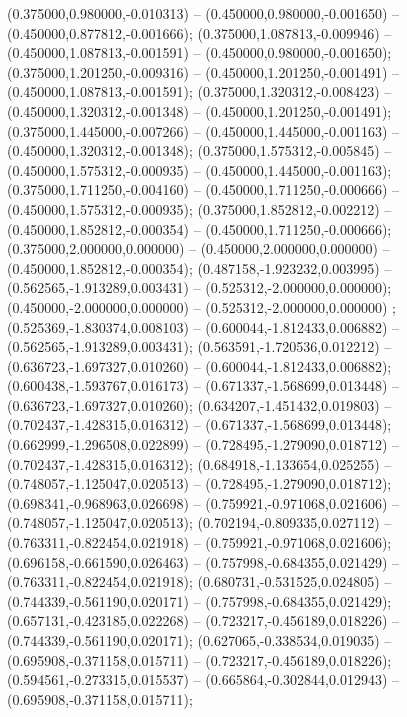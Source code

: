  (0.375000,0.980000,-0.010313) -- (0.450000,0.980000,-0.001650) -- (0.450000,0.877812,-0.001666);
 (0.375000,1.087813,-0.009946) -- (0.450000,1.087813,-0.001591) -- (0.450000,0.980000,-0.001650);
 (0.375000,1.201250,-0.009316) -- (0.450000,1.201250,-0.001491) -- (0.450000,1.087813,-0.001591);
 (0.375000,1.320312,-0.008423) -- (0.450000,1.320312,-0.001348) -- (0.450000,1.201250,-0.001491);
 (0.375000,1.445000,-0.007266) -- (0.450000,1.445000,-0.001163) -- (0.450000,1.320312,-0.001348);
 (0.375000,1.575312,-0.005845) -- (0.450000,1.575312,-0.000935) -- (0.450000,1.445000,-0.001163);
 (0.375000,1.711250,-0.004160) -- (0.450000,1.711250,-0.000666) -- (0.450000,1.575312,-0.000935);
 (0.375000,1.852812,-0.002212) -- (0.450000,1.852812,-0.000354) -- (0.450000,1.711250,-0.000666);
 (0.375000,2.000000,0.000000) -- (0.450000,2.000000,0.000000) -- (0.450000,1.852812,-0.000354);
 (0.487158,-1.923232,0.003995) -- (0.562565,-1.913289,0.003431) -- (0.525312,-2.000000,0.000000);
 (0.450000,-2.000000,0.000000) -- (0.525312,-2.000000,0.000000) ;
 (0.525369,-1.830374,0.008103) -- (0.600044,-1.812433,0.006882) -- (0.562565,-1.913289,0.003431);
 (0.563591,-1.720536,0.012212) -- (0.636723,-1.697327,0.010260) -- (0.600044,-1.812433,0.006882);
 (0.600438,-1.593767,0.016173) -- (0.671337,-1.568699,0.013448) -- (0.636723,-1.697327,0.010260);
 (0.634207,-1.451432,0.019803) -- (0.702437,-1.428315,0.016312) -- (0.671337,-1.568699,0.013448);
 (0.662999,-1.296508,0.022899) -- (0.728495,-1.279090,0.018712) -- (0.702437,-1.428315,0.016312);
 (0.684918,-1.133654,0.025255) -- (0.748057,-1.125047,0.020513) -- (0.728495,-1.279090,0.018712);
 (0.698341,-0.968963,0.026698) -- (0.759921,-0.971068,0.021606) -- (0.748057,-1.125047,0.020513);
 (0.702194,-0.809335,0.027112) -- (0.763311,-0.822454,0.021918) -- (0.759921,-0.971068,0.021606);
 (0.696158,-0.661590,0.026463) -- (0.757998,-0.684355,0.021429) -- (0.763311,-0.822454,0.021918);
 (0.680731,-0.531525,0.024805) -- (0.744339,-0.561190,0.020171) -- (0.757998,-0.684355,0.021429);
 (0.657131,-0.423185,0.022268) -- (0.723217,-0.456189,0.018226) -- (0.744339,-0.561190,0.020171);
 (0.627065,-0.338534,0.019035) -- (0.695908,-0.371158,0.015711) -- (0.723217,-0.456189,0.018226);
 (0.594561,-0.273315,0.015537) -- (0.665864,-0.302844,0.012943) -- (0.695908,-0.371158,0.015711);
